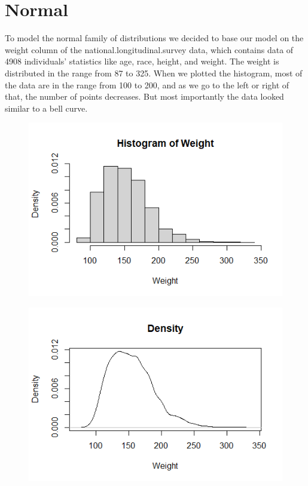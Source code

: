 \documentclass[12pt, a4paper, oneside]{report}
\begin{document}
\newpage
\section{Normal}
To model the normal family of distributions we decided to base our model on the weight column of the national.longitudinal.survey data, which contains data of 4908 individuals' statistics like age, race, height, and weight. The weight is distributed in the range from 87 to 325. When we plotted the histogram, most of the data are in the range from 100 to 200, and as we go to the left or right of that, the number of points decreases. But most importantly the data looked similar to a bell curve.

\begin{figure}[h]
  \centering
  \includegraphics[width=0.8\linewidth]{normHist.png}
\end{figure}

\begin{figure}[h]
  \centering
  \includegraphics[width=0.8\linewidth]{normDensity.png}
\end{figure}
\end{document}
